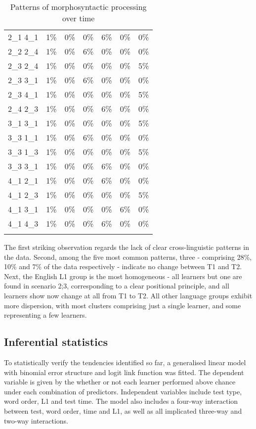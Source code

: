 \begin{table}
\begin{tabularx}{\textwidth}{XXXXXXX}
        2\_1 4\_1 & 1\% & 0\% & 0\% & 6\% & 0\% & 0\%\\
        2\_2 2\_4 & 1\% & 0\% & 6\% & 0\% & 0\% & 0\%\\
        2\_3 2\_4 & 1\% & 0\% & 0\% & 0\% & 0\% & 5\%\\
        2\_3 3\_1 & 1\% & 0\% & 6\% & 0\% & 0\% & 0\%\\
        2\_3 4\_1 & 1\% & 0\% & 0\% & 0\% & 0\% & 5\%\\
        2\_4 2\_3 & 1\% & 0\% & 0\% & 6\% & 0\% & 0\%\\
        3\_1 3\_1 & 1\% & 0\% & 0\% & 0\% & 0\% & 5\%\\
        3\_3 1\_1 & 1\% & 0\% & 6\% & 0\% & 0\% & 0\%\\
        3\_3 1\_3 & 1\% & 0\% & 0\% & 0\% & 0\% & 5\%\\
        3\_3 3\_1 & 1\% & 0\% & 0\% & 6\% & 0\% & 0\%\\
        4\_1 2\_1 & 1\% & 0\% & 0\% & 6\% & 0\% & 0\%\\
        4\_1 2\_3 & 1\% & 0\% & 0\% & 0\% & 0\% & 5\%\\
        4\_1 3\_1 & 1\% & 0\% & 0\% & 0\% & 6\% & 0\%\\
        4\_1 4\_3 & 1\% & 0\% & 0\% & 6\% & 0\% & 0\%\\
        \lspbottomrule
    \end{tabularx}
    \caption{Patterns of morphosyntactic processing over time}
    \label{tab:06:6}
\end{table}

The first striking observation regards the lack of clear cross-linguistic patterns in the data. Second, among the five most common patterns, three - comprising 28\%, 10\% and 7\% of the data respectively - indicate no change between T1 and T2. Next, the English L1 group is the most homogeneous - all learners but one are found in scenario 2;3, corresponding to a clear positional principle, and all learners show now change at all from T1 to T2. All other language groups exhibit more dispersion, with most clusters comprising just a single learner, and some representing a few learners. 

\subsection{Inferential statistics}\label{sec:06:3.2}

To statistically verify the tendencies identified so far, a generalised linear model with binomial error structure and logit link function \citep{Baayen2008} was fitted. The dependent variable is given by the whether or not each learner performed above chance under each combination of predictors. Independent variables include test type, word order, L1 and test time. The model also includes a four-way interaction between test, word order, time and L1, as well as all implicated three-way and two-way interactions. 

